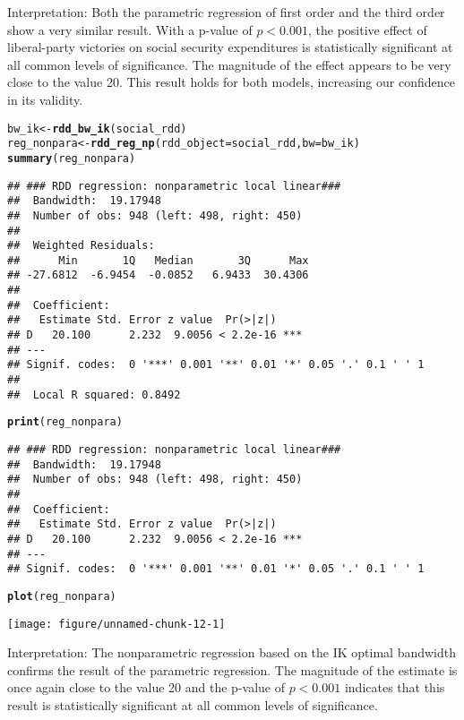 \documentclass[12pt]{article}\usepackage[]{graphicx}\usepackage[]{color}
\makeatletter
\def\maxwidth{ %
  \ifdim\Gin@nat@width>\linewidth
    \linewidth
  \else
    \Gin@nat@width
  \fi
}
\newcommand{\hlstd}[1]{\textcolor[rgb]{0.345,0.345,0.345}{#1}}%
\newcommand{\hlkwb}[1]{\textcolor[rgb]{0.69,0.353,0.396}{#1}}%
\newcommand{\hlkwc}[1]{\textcolor[rgb]{0.333,0.667,0.333}{#1}}%
\newcommand{\hlkwd}[1]{\textcolor[rgb]{0.737,0.353,0.396}{\textbf{#1}}}%
\newenvironment{kframe}{%
 \def\at@end@of@kframe{}%
 \ifinner\ifhmode%
  \def\at@end@of@kframe{\end{minipage}}%
  \begin{minipage}{\columnwidth}%
 \fi\fi%
 \def\FrameCommand##1{\hskip\@totalleftmargin \hskip-\fboxsep
 \colorbox{shadecolor}{##1}\hskip-\fboxsep
     \hskip-\linewidth \hskip-\@totalleftmargin \hskip\columnwidth}%
 \MakeFramed {\advance\hsize-\width
   \@totalleftmargin\z@ \linewidth\hsize
   \@setminipage}}%
 {\par\unskip\endMakeFramed%
 \at@end@of@kframe}
\newenvironment{knitrout}{}{} %
\makeatother
\begin{document}
Interpretation: Both the parametric regression of first order and the third order show a very similar result. With a p-value of $p < 0.001$, the positive effect of liberal-party victories on social security expenditures is statistically significant at all common levels of significance. The magnitude of the effect appears to be very close to the value 20. This result holds for both models, increasing our confidence in its validity.

\begin{knitrout}
\color{fgcolor}\begin{kframe}
\begin{alltt}
\hlstd{bw_ik} \hlkwb{<-} \hlkwd{rdd_bw_ik}\hlstd{(social_rdd)}
\hlstd{reg_nonpara} \hlkwb{<-} \hlkwd{rdd_reg_np}\hlstd{(}\hlkwc{rdd_object} \hlstd{= social_rdd,} \hlkwc{bw} \hlstd{= bw_ik)}
\hlkwd{summary}\hlstd{(reg_nonpara)}
\end{alltt}
\begin{verbatim}
## ### RDD regression: nonparametric local linear###
## 	Bandwidth:  19.17948 
## 	Number of obs: 948 (left: 498, right: 450)
## 
## 	Weighted Residuals:
##      Min       1Q   Median       3Q      Max 
## -27.6812  -6.9454  -0.0852   6.9433  30.4306 
## 
## 	Coefficient:
##   Estimate Std. Error z value  Pr(>|z|)    
## D   20.100      2.232  9.0056 < 2.2e-16 ***
## ---
## Signif. codes:  0 '***' 0.001 '**' 0.01 '*' 0.05 '.' 0.1 ' ' 1
## 
## 	Local R squared: 0.8492
\end{verbatim}
\begin{alltt}
\hlkwd{print}\hlstd{(reg_nonpara)}
\end{alltt}
\begin{verbatim}
## ### RDD regression: nonparametric local linear###
## 	Bandwidth:  19.17948 
## 	Number of obs: 948 (left: 498, right: 450)
## 
## 	Coefficient:
##   Estimate Std. Error z value  Pr(>|z|)    
## D   20.100      2.232  9.0056 < 2.2e-16 ***
## ---
## Signif. codes:  0 '***' 0.001 '**' 0.01 '*' 0.05 '.' 0.1 ' ' 1
\end{verbatim}
\begin{alltt}
\hlkwd{plot}\hlstd{(reg_nonpara)}
\end{alltt}
\end{kframe}
\texttt{[image: figure/unnamed-chunk-12-1]} 

\end{knitrout}

Interpretation: The nonparametric regression based on the IK optimal bandwidth confirms the result of the parametric regression. The magnitude of the estimate is once again close to the value 20 and the p-value of $p < 0.001$ indicates that this result is statistically significant at all common levels of significance.
\end{document}

